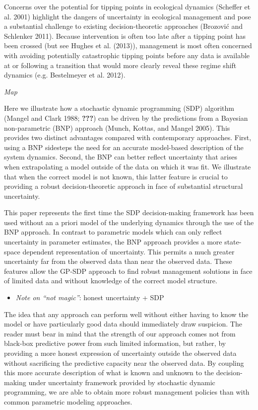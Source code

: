 \documentclass[author-year, review]{elsarticle} %
\begin{document}
Concerns over the potential for tipping points in ecological dynamics
(Scheffer et al. 2001) highlight the dangers of uncertainty in
ecological management and pose a substantial challenge to existing
decision-theoretic approaches (Brozović and Schlenker 2011). Because
intervention is often too late after a tipping point has been crossed
(but see Hughes et al. (2013)), management is most often concerned with
avoiding potentially catastrophic tipping points before any data is
available at or following a transition that would more clearly reveal
these regime shift dynamics (e.g. Bestelmeyer et al. 2012).

\emph{Map}

Here we illustrate how a stochastic dynamic programming (SDP) algorithm
(Mangel and Clark 1988; {\textbf{???}}) can be driven by the predictions
from a Bayesian non-parametric (BNP) approach (Munch, Kottas, and Mangel
2005). This provides two distinct advantages compared with contemporary
approaches. First, using a BNP sidesteps the need for an accurate
model-based description of the system dynamics. Second, the BNP can
better reflect uncertainty that arises when extrapolating a model
outside of the data on which it was fit. We illustrate that when the
correct model is not known, this latter feature is crucial to providing
a robust decision-theoretic approach in face of substantial structural
uncertainty.

This paper represents the first time the SDP decision-making framework
has been used without an a priori model of the underlying dynamics
through the use of the BNP approach. In contrast to parametric models
which can only reflect uncertainty in parameter estimates, the BNP
approach provides a more state-space dependent representation of
uncertainty. This permits a much greater uncertainty far from the
observed data than near the observed data. These features allow the
GP-SDP approach to find robust management solutions in face of limited
data and without knowledge of the correct model structure.

\begin{itemize}
\itemsep1pt\parskip0pt
\item
  \emph{Note on ``not magic''}: honest uncertainty + SDP
\end{itemize}

The idea that any approach can perform well without either having to
know the model or have particularly good data should immediately draw
suspicion. The reader must bear in mind that the strength of our
approach comes not from black-box predictive power from such limited
information, but rather, by providing a more honest expression of
uncertainty outside the observed data without sacrificing the predictive
capacity near the observed data. By coupling this more accurate
description of what is known and unknown to the decision-making under
uncertainty framework provided by stochastic dynamic programming, we are
able to obtain more robust management policies than with common
parametric modeling approaches.
\end{document}
